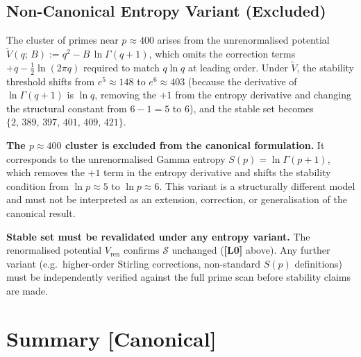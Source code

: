 \documentclass[12pt,a4paper]{article}
\theoremstyle{definition}
\theoremstyle{remark}
\newcommand{\Lzero}{\textbf{[L0]}}
\begin{document}
\subsection{Non-Canonical Entropy Variant (Excluded)}
\label{sec:pss:gamma:excluded}

The cluster of primes near $p \approx 400$ arises from the unrenormalised
potential $\tilde{V}(q;\,B) := q^2 - B\,\ln\Gamma(q+1)$, which omits the
correction terms $+q - \frac{1}{2}\ln(2\pi q)$ required to match $q\ln q$
at leading order.  Under $\tilde{V}$, the stability threshold shifts from
$e^5\approx 148$ to $e^6\approx 403$ (because the derivative of $\ln\Gamma(q+1)$
is $\ln q$, removing the $+1$ from the entropy derivative and changing the
structural constant from $6-1=5$ to $6$), and the stable set becomes
$\{2,\,389,\,397,\,401,\,409,\,421\}$.

\begin{warnbox}
\textbf{The $p \approx 400$ cluster is excluded from the canonical formulation.}
It corresponds to the unrenormalised Gamma entropy $S(p) = \ln\Gamma(p+1)$,
which removes the $+1$ term in the entropy derivative and shifts the stability
condition from $\ln p \approx 5$ to $\ln p \approx 6$.  This variant is a
structurally different model and must not be interpreted as an extension,
correction, or generalisation of the canonical result.
\end{warnbox}

\begin{warnbox}
\textbf{Stable set must be revalidated under any entropy variant.}
The renormalised potential $V_{\mathrm{ren}}$ confirms $\mathcal{S}$ unchanged
(\Lzero{} above).  Any further variant (e.g.\ higher-order Stirling corrections,
non-standard $S(p)$ definitions) must be independently verified against the
full prime scan before stability claims are made.
\end{warnbox}

\section{Summary \textnormal{[Canonical]}}
\label{sec:pss:summary}
\end{document}
